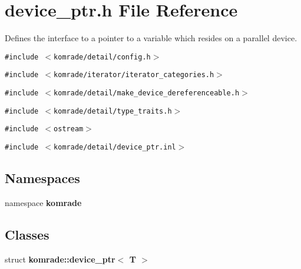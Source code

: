 \section{device\_\-ptr.h File Reference}
\label{device__ptr_8h}
Defines the interface to a pointer to a variable which resides on a parallel device. 

{\tt \#include $<$komrade/detail/config.h$>$}\par
{\tt \#include $<$komrade/iterator/iterator\_\-categories.h$>$}\par
{\tt \#include $<$komrade/detail/make\_\-device\_\-dereferenceable.h$>$}\par
{\tt \#include $<$komrade/detail/type\_\-traits.h$>$}\par
{\tt \#include $<$ostream$>$}\par
{\tt \#include $<$komrade/detail/device\_\-ptr.inl$>$}\par
\subsection*{Namespaces}
\begin{CompactItemize}
\item 
namespace {\bf komrade}
\end{CompactItemize}
\subsection*{Classes}
\begin{CompactItemize}
\item 
struct {\bf komrade::device\_\-ptr$<$ T $>$}
\end{CompactItemize}
